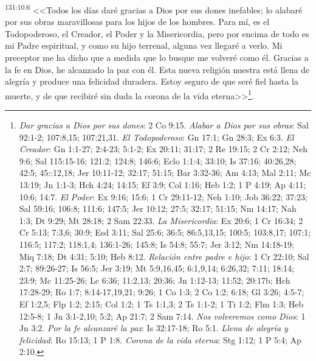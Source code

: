 \par 
\textsuperscript{131:10.6} <<Todos los días daré gracias a Dios por sus dones inefables; lo alabaré por sus obras maravillosas para los hijos de los hombres. Para mí, es el Todopoderoso, el Creador, el Poder y la Misericordia, pero por encima de todo es mi Padre espiritual, y como su hijo terrenal, alguna vez llegaré a verlo. Mi preceptor me ha dicho que a medida que lo busque me volveré como él. Gracias a la fe en Dios, he alcanzado la paz con él. Esta nueva religión nuestra está llena de alegría y produce una felicidad duradera. Estoy seguro de que seré fiel hasta la muerte, y de que recibiré sin duda la corona de la vida eterna>>\footnote{\textit{Dar gracias a Dios por sus dones}: 2 Co 9:15. \textit{Alabar a Dios por sus obras}: Sal 92:1-2; 107:8,15; 107:21,31. \textit{El Todopoderoso}: Gn 17:1; Gn 28:3; Ex 6:3. \textit{El Creador}: Gn 1:1-27; 2:4-23; 5:1-2; Ex 20:11; 31:17; 2 Re 19:15; 2 Cr 2:12; Neh 9:6; Sal 115:15-16; 121:2; 124:8; 146:6; Eclo 1:1:4; 33:10; Is 37:16; 40:26,28; 42:5; 45::12,18; Jer 10:11-12; 32:17; 51:15; Bar 3:32-36; Am 4:13; Mal 2:11; Mc 13:19; Jn 1:1-3; Hch 4:24; 14:15; Ef 3:9; Col 1:16; Heb 1:2; 1 P 4:19; Ap 4:11; 10:6; 14:7. \textit{El Poder}: Ex 9:16; 15:6; 1 Cr 29:11-12; Neh 1:10; Job 36:22; 37:23; Sal 59:16; 106:8; 111:6; 147:5; Jer 10:12; 27:5; 32:17; 51:15; Nm 14:17; Nah 1:3; Dt 9:29; Mt 28:18; 2 Sam 22:33. \textit{La Misericordia}: Ex 20:6; 1 Cr 16:34; 2 Cr 5:13; 7:3,6; 30:9; Esd 3:11; Sal 25:6; 36:5; 86:5,13,15; 100:5; 103:8,17; 107:1; 116:5; 117:2; 118:1,4; 136:1-26; 145:8; Is 54:8; 55:7; Jer 3:12; Nm 14:18-19; Miq 7:18; Dt 4:31; 5:10; Heb 8:12. \textit{Relación entre padre e hijo}: 1 Cr 22:10; Sal 2:7; 89:26-27; Is 56:5; Jer 3:19; Mt 5:9,16,45; 6:1,9,14; 6:26,32; 7:11; 18:14; 23:9; Mc 11:25-26; Lc 6:36; 11:2,13; 20:36; Jn 1:12-13; 11:52; 20:17b; Hch 17:28-29; Ro 1:7; 8:14-17,19,21; 9:26; 1 Co 1:3; 2 Co 1:2; 6:18; Gl 3:26; 4:5-7; Ef 1:2,5; Flp 1:2; 2:15; Col 1:2; 1 Ts 1:1,3; 2 Ts 1:1-2; 1 Ti 1:2; Flm 1:3; Heb 12:5-8; 1 Jn 3:1-2,10; 5:2; Ap 21:7; 2 Sam 7:14. \textit{Nos volveremos como Dios}: 1 Jn 3:2. \textit{Por la fe alcanzaré la paz}: Is 32:17-18; Ro 5:1. \textit{Llena de alegría y felicidad}: Ro 15:13; 1 P 1:8. \textit{Corona de la vida eterna}: Stg 1:12; 1 P 5:4; Ap 2:10.}.

